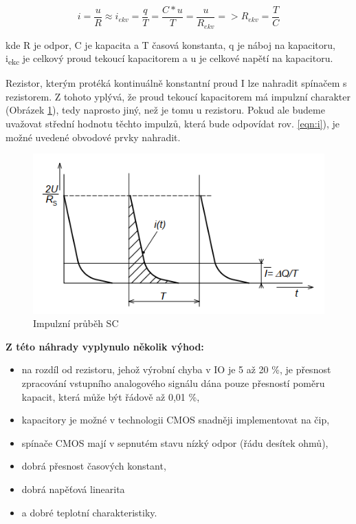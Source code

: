 \begin{equation}
i=\frac{u}{R} \approx i_{ekv}=\frac{q}{T}=\frac{C*u}{T}=\frac{u}{R_{ekv}} => R_{ekv}=\frac{T}{C}
\label{eqn:i}
\end{equation}  

kde R je odpor, C je kapacita a T časová konstanta, q je náboj na kapacitoru, i\textsubscript{ekc} je celkový proud tekoucí
kapacitorem a u je celkové napětí na kapacitoru.

Rezistor, kterým protéká kontinuálně konstantní proud I lze nahradit spínačem s rezistorem. Z tohoto yplývá, že proud tekoucí kapacitorem má impulzní charakter (Obrázek \ref{fig:impulz}), tedy naprosto jiný, než je tomu u rezistoru. Pokud ale budeme uvažovat střední hodnotu těchto impulzů, která bude odpovídat rov. \ref{eqn:i}), je možné uvedené obvodové prvky nahradit.

   \begin{figure}[h]
   \begin{center}
     \includegraphics[scale=0.6]{images/Impulz.png}
   \end{center}
   \caption{Impulzní průběh SC}
   \label{fig:impulz}
  \end{figure}
  
  
\textbf{Z této náhrady vyplynulo několik výhod:} 
\begin{itemize}
\item na rozdíl od rezistoru, jehož výrobní chyba v IO je 5 až 20 \%, je přesnost
zpracování vstupního analogového signálu dána pouze přesností poměru kapacit,
která může být řádově až 0,01 \%,
\item  kapacitory je možné v technologii CMOS snadněji implementovat na čip,
\item  spínače CMOS mají v sepnutém stavu nízký odpor (řádu desítek ohmů),
\item  dobrá přesnost časových konstant,
\item  dobrá napěťová linearita
\item a dobré teplotní charakteristiky.
\end{itemize}

